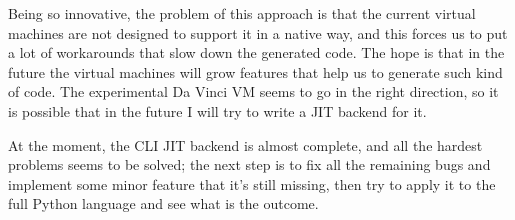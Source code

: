 {Being so innovative, the problem of this approach is that the current virtual machines are not designed to support it in a native way, and this forces us to put a lot of workarounds that slow down the generated code. The hope is that in the future the virtual machines will grow features that help us to generate such kind of code. The experimental Da Vinci VM seems to go in the right direction, so it is possible that in the future I will try to write a JIT backend for it.

At the moment, the CLI JIT backend is almost complete, and all the hardest problems seems to be solved; the next step is to fix all the remaining bugs and implement some minor feature that it's still missing, then try to apply it to the full Python language and see what is the outcome.
}

